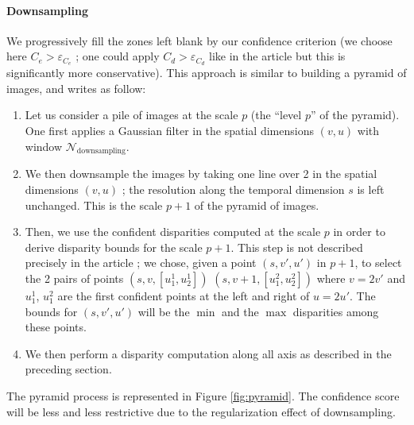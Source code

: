 \documentclass{article}
\theoremstyle{definition}
\begin{document}
\paragraph{Downsampling} We progressively fill the zones left blank by our confidence criterion (we choose here $C_e > \varepsilon_{C_e}$ ; one could apply $C_d > \varepsilon_{C_d}$ like in the article but this is significantly more conservative). This approach is similar to building a pyramid of images, and writes as follow:
\begin{enumerate}
 \item Let us consider a pile of images at the scale $p$ (the ``level $p$'' of the pyramid). One first applies a Gaussian filter in the spatial dimensions $(v, u)$ with window $\mathcal{N}_\text{downsampling}$.
 \item We then downsample the images by taking one line over 2 in the spatial dimensions $(v, u)$ ; the resolution along the temporal dimension $s$ is left unchanged. This is the scale $p+1$ of the pyramid of images.
 \item Then, we use the confident disparities computed at the scale $p$ in order to derive disparity bounds for the scale $p+1$. This step is not described precisely in the article ; we chose, given a point $(s, v', u')$ in $p+1$, to select the 2 pairs of points $(s, v, [u_1^1, u_2^1])$ $(s, v+1, [u_1^2, u_2^2])$ where $v = 2 v'$ and $u_1^1$, $u_1^2$ are the first confident points at the left and right of $u=2u'$. The bounds for $(s, v', u')$ will be the $\min$ and the $\max$ disparities among these points.
 \item We then perform a disparity computation along all axis as described in the preceding section.
\end{enumerate}
The pyramid process is represented in Figure \ref{fig:pyramid}. The confidence score will be less and less restrictive due to the regularization effect of downsampling.
\end{document}
